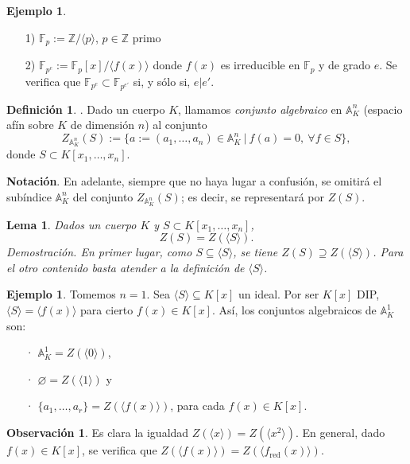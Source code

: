 \documentclass[a4paper,12pt]{article}
\newcommand{\Z}{\mathbb{Z}}
\newcommand{\A}{\mathbb{A}}
\newtheorem{lemma}[theorem]{Lema}
\theoremstyle{definition}
\newtheorem{definition}[theorem]{Definición}
\newtheorem{example}[theorem]{Ejemplo}
\newtheorem{remark}[theorem]{Observación}
\begin{document}
\begin{example}\begin{itemize}
    \item[1)] $\mathbb{F}_p:=\Z/\langle p\rangle$, $p\in\Z$ primo
    \item[2)] $\mathbb{F}_{p^e}:=\mathbb{F}_p[x]/\langle f(x)\rangle$ donde $f(x)$ es irreducible en $\mathbb{F}_p$ y de grado $e$. Se verifica que $\mathbb{F}_{p^{e}}\subset\mathbb{F}_{p^{e'}}$ si, y sólo si, $e|e'$.
\end{itemize}
\end{example}

\begin{definition}. Dado un cuerpo $K$, llamamos \textit{conjunto algebraico} en $\A_K^n$ (espacio afín sobre $K$ de dimensión $n$) al conjunto$$Z_{\A_K^n}(S):=\{a:=(a_1,\dots,a_n)\in\A_K^n\ |\ f(a)=0,\ \forall f\in S\},$$donde $S\subset K[x_1,\dots,x_n]$.
\end{definition}

\textbf{Notación}. En adelante, siempre que no haya lugar a confusión, se omitirá el subíndice $\A_K^n$ del conjunto $Z_{\A_K^n}(S)$; es decir, se representará por $Z(S)$.

\begin{lemma} Dados un cuerpo $K$ y $S\subset K[x_1,\dots,x_n]$,$$Z(S)=Z(\langle S\rangle).$$
Demostración. En primer lugar, como $S\subseteq \langle S\rangle$, se tiene $Z(S)\supseteq Z(\langle S\rangle)$. Para el otro contenido basta atender a la definición de $\langle S\rangle$.
\end{lemma}

\begin{example} Tomemos $n=1$. Sea $\langle S\rangle\subseteq K[x]$ un ideal. Por ser $K[x]$ DIP, $\langle S\rangle=\langle f(x)\rangle$ para cierto $f(x)\in K[x]$. Así, los conjuntos algebraicos de $\A_K^1$ son:\begin{itemize}
    \item[·] $\A_K^1=Z(\langle 0\rangle)$,
    \item[·] $\varnothing=Z(\langle 1\rangle)$ y
    \item[·] $\{a_1,\dots,a_r\}=Z(\langle f(x)\rangle)$, para cada $f(x)\in K[x]$.
\end{itemize}
\end{example}

\begin{remark} Es clara la igualdad $Z(\langle x\rangle)=Z(\langle x^2\rangle)$. En general, dado $f(x)\in K[x]$, se verifica que $Z(\langle f(x)\rangle)=Z(\langle f_{\text{red}}(x)\rangle)$.
\end{remark}
\end{document}
